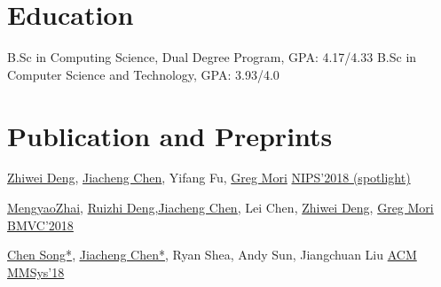 \documentclass[12pt,a4paper,sans]{moderncv}   %
\begin{document}
\maketitle

\section{Education}
	{B.Sc in Computing Science, Dual Degree Program, GPA: 4.17/4.33}  %
	{B.Sc in Computer Science and Technology, GPA: 3.93/4.0}


\section{Publication and Preprints}

{}
{\newline \href{http://www.cs.sfu.ca/~zhiweid/}{Zhiwei Deng}, \underline{\href{http://jcchen.me/}{Jiacheng Chen}}, {Yifang Fu}, \href{http://www.cs.sfu.ca/~mori/}{Greg Mori}}
{\newline \href{}{NIPS'2018 (spotlight)}}
{}


{}
{\newline \href{https://mzhai.weebly.com/}{MengyaoZhai}, \href{http://www.sfu.ca/~ruizhid/}{Ruizhi Deng},\underline{\href{http://jcchen.me/}{Jiacheng Chen}}, {Lei Chen}, \href{http://www.cs.sfu.ca/~zhiweid/}{Zhiwei Deng}, \href{http://www.cs.sfu.ca/~mori/}{Greg Mori}}
{\newline \href{}{BMVC'2018}}
{}


{}
{\newline \href{https://songc.me/}{Chen Song*}, \underline{\href{http://jcchen.me/}{Jiacheng Chen*}}, {Ryan Shea}, {Andy Sun}, {Jiangchuan Liu}}
{\newline \href{}{ACM MMSys'18}}
{}
\end{document}
